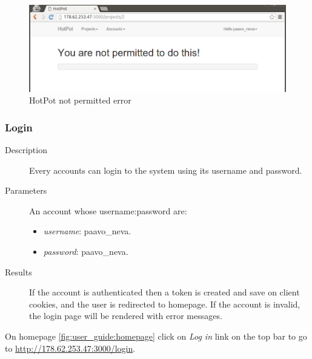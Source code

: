 \begin{figure}[bth]                                                                                                                                                  \myfloatalign
\includegraphics[width=1.0\linewidth]{gfx/chapter_5/general/not_permitted}
\caption[HotPot not permitted error]{HotPot not permitted error}
\label{fig:user_guide:not_permitted}
\end{figure}

\clearpage

\subsubsection{Login}
\label{ch:appendix-a:user_guide:miscellaneous:login}

\begin{description}
\item[Description] Every accounts can login to the system using its username and password.
\item[Parameters] An account whose username:password are:
\begin{itemize}
\item \emph{username}: paavo\_neva.
\item \emph{password}: paavo\_neva.
\end{itemize}
\item[Results] If the account is authenticated then a token is created and save on client cookies, and the user is redirected to homepage.
If the account is invalid, the login page will be rendered with error messages.
\end{description}

On homepage \autoref{fig:user_guide:homepage} click on \emph{Log in} link on the top bar to go to \href{http://178.62.253.47:3000/login}{http://178.62.253.47:3000/login}.

